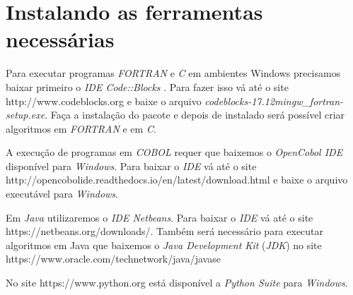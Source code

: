 \documentclass[conference]{IEEEtran}
\begin{document}
\begin{comment}
A PHP surgiu em 1995, orientada a objetos, é bastante usada para o desenvolvimento do lado servidor de aplicações web. Foi criada por Rasmus Lerdorf.

Surgida em 1993 pelos desenvolvedores Roberto Ierusalimschy, Luiz Henrique de Figueiredo e Waldemar Celes,  a linguagem Lua é muito utilizada em desenvolvimento de jogos. Ela foi criada nos laboratórios da PUC-RIO e é multiparadigma.

Nomeada em homenagem ao físico Blaise Pascal, Pascal surgiu em 1970 criada por Niklaus Wirth. É uma linguagem procedural muito utilizada no ensino de programação.

Prolog é uma linguagem declarativa que surgiu em 1972, criada por Alain Colmerauer e Robert Kowalski na Universidade de Marselha. Foi muito utilizada para soluções de problemas lógicos e inteligência artificial.

As linguagens de programação que serão tratadas nesse artigo são: FORTRAN, C, COBOL, JAVA, PYTHON, C#, PHP, LUA, PASCAL e PROLOG.
\end{comment}

\section{Instalando as ferramentas necessárias}

Para executar programas \textit{FORTRAN} e \textit{C} em ambientes Windows precisamos baixar primeiro o \textit{IDE Code::Blocks} . Para fazer isso vá até o site http://www.codeblocks.org e baixe o arquivo \textit{codeblocks-17.12mingw\_fortran-setup.exe}.
Faça a instalação do pacote e depois de instalado será possível criar algoritmos em \textit{FORTRAN} e em \textit{C}.

A execução de programas em \textit{COBOL} requer que baixemos o \textit{OpenCobol IDE}  disponível para \textit{Windows}. Para baixar o \textit{IDE} vá até o site http://opencobolide.readthedocs.io/en/latest/download.html e baixe o arquivo executável para \textit{Windows}.

Em \textit{Java} utilizaremos o \textit{IDE Netbeans}. Para baixar o \textit{IDE} vá até o site https://netbeans.org/downloads/. Também será necessário para executar algoritmos em Java que baixemos o \textit{Java Development Kit} (\textit{JDK}) no site https://www.oracle.com/technetwork/java/javase

No site https://www.python.org está disponível a \textit{Python Suite} para \textit{Windows}.
\end{document}
